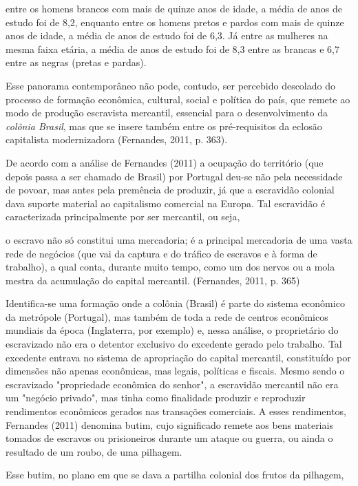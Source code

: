  entre os homens brancos com mais de quinze anos de idade, a média de anos de estudo
 foi de 8,2, enquanto entre os homens pretos e pardos com mais de quinze anos de
 idade, a média de anos de estudo foi de 6,3. Já entre as mulheres na mesma faixa
 etária, a média de anos de estudo foi de 8,3 entre as brancas e 6,7 entre as negras
 (pretas e pardas).\par Esse panorama contemporâneo não pode, contudo, ser percebido descolado do processo de
 formação econômica, cultural, social e política do país, que remete ao modo de
 produção escravista mercantil, essencial para o desenvolvimento da \textit{colônia
 Brasil}, mas que se insere também entre os pré-requisitos da eclosão
 capitalista modernizadora (Fernandes, 2011, p.
 363).\par De acordo com a análise de Fernandes (2011) a
 ocupação do território (que depois passa a ser chamado de Brasil) por Portugal deu-se
 não pela necessidade de povoar, mas antes pela premência de produzir, já que a
 escravidão colonial dava suporte material ao capitalismo comercial na Europa. Tal
 escravidão é caracterizada principalmente por ser mercantil, ou seja,\par [...] o escravo não só constitui uma mercadoria; é a principal mercadoria de uma
 vasta rede de negócios (que vai da captura e do tráfico de escravos e à forma de
 trabalho), a qual conta, durante muito tempo, como um dos nervos ou a mola mestra
 da acumulação do capital mercantil. (Fernandes,
 2011, p. 365)\par Identifica-se uma formação onde a colônia (Brasil) é parte do sistema econômico da
 metrópole (Portugal), mas também de toda a rede de centros econômicos mundiais da
 época (Inglaterra, por exemplo) e, nessa análise, o proprietário do escravizado não
 era o detentor exclusivo do excedente gerado pelo trabalho. Tal excedente entrava no
 sistema de apropriação do capital mercantil, constituído por dimensões não apenas
 econômicas, mas legais, políticas e fiscais. Mesmo sendo o escravizado "propriedade
 econômica do senhor", a escravidão mercantil não era um "negócio privado", mas tinha
 como finalidade produzir e reproduzir rendimentos econômicos gerados nas transações
 comerciais. A esses rendimentos, Fernandes
 (2011) denomina butim, cujo significado remete aos bens materiais tomados
 de escravos ou prisioneiros durante um ataque ou guerra, ou ainda o resultado de um
 roubo, de uma pilhagem.\par Esse butim, no plano em que se dava a partilha colonial dos frutos da pilhagem,
